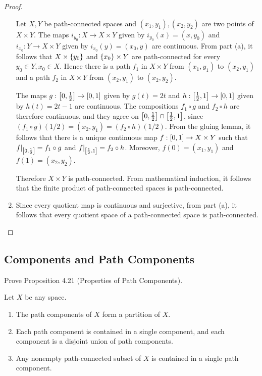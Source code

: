 \begin{proof}
\begin{enumerate}[label={(\alph*)}]
		      Let $X, Y$ be path-connected spaces and $(x_{1}, y_{1}), (x_{2}, y_{2})$ are two points of $X\times Y$. The maps $i_{y_{0}}: X\to X\times Y$ given by $i_{y_{0}}(x) = (x, y_{0})$ and $i_{x_{0}}: Y\to X\times Y$ given by $i_{x_{0}}(y) = (x_{0}, y)$ are continuous. From part (a), it follows that $X\times\left\{{y_{0}}\right\}$ and $\left\{{x_{0}}\right\}\times Y$ are path-connected for every $y_{0} \in Y, x_{0}\in X$. Hence there is a path $f_{1}$ in $X\times Y$ from $(x_{1}, y_{1})$ to $(x_{2}, y_{1})$ and a path $f_{2}$ in $X\times Y$ from $(x_{2}, y_{1})$ to $(x_{2}, y_{2})$.

		      The maps $g: \left[{0, \frac{1}{2}}\right] \to \left[{0, 1}\right]$ given by $g(t) = 2t$ and $h: \left[{\frac{1}{2}, 1}\right] \to \left[{0, 1}\right]$ given by $h(t) = 2t - 1$ are continuous. The compositions $f_{1}\circ g$ and $f_{2}\circ h$ are therefore continuous, and they agree on $\left[{0, \frac{1}{2}}\right] \cap \left[{\frac{1}{2}, 1}\right]$, since $(f_{1}\circ g)(1/2) = (x_{2}, y_{1}) = (f_{2}\circ h)(1/2)$. From the gluing lemma, it follows that there is a unique continuous map $f: \left[{0, 1}\right] \to X\times Y$ such that $f\vert_{\left[{0, \frac{1}{2}}\right]} = f_{1}\circ g$ and $f\vert_{\left[{\frac{1}{2}, 1}\right]} = f_{2}\circ h$. Moreover, $f(0) = (x_{1}, y_{1})$ and $f(1) = (x_{2}, y_{2})$.

		      Therefore $X\times Y$ is path-connected. From mathematical induction, it follows that the finite product of path-connected spaces is path-connected.
		\item Since every quotient map is continuous and surjective, from part (a), it follows that every quotient space of a path-connected space is path-connected.
	\end{enumerate}
\end{proof}

\subsection*{Components and Path Components}

\begin{exercise}{4.22}
	Prove Proposition 4.21 (Properties of Path Components).

	Let $X$ be any space.
	\begin{enumerate}[label={(\alph*)}]
		\item The path components of $X$ form a partition of $X$.
		\item Each path component is contained in a single component, and each component is a disjoint union of path components.
		\item Any nonempty path-connected subset of $X$ is contained in a single path component.
	\end{enumerate}
\end{exercise}

